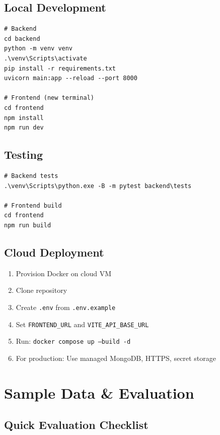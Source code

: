 \documentclass[11pt]{article}
\begin{document}
\subsection{Local Development}

\begin{verbatim}
# Backend
cd backend
python -m venv venv
.\venv\Scripts\activate
pip install -r requirements.txt
uvicorn main:app --reload --port 8000

# Frontend (new terminal)
cd frontend
npm install
npm run dev
\end{verbatim}

\subsection{Testing}

\begin{verbatim}
# Backend tests
.\venv\Scripts\python.exe -B -m pytest backend\tests

# Frontend build
cd frontend
npm run build
\end{verbatim}

\subsection{Cloud Deployment}

\begin{enumerate}
  \item Provision Docker on cloud VM
  \item Clone repository
  \item Create \texttt{.env} from \texttt{.env.example}
  \item Set \texttt{FRONTEND\_URL} and \texttt{VITE\_API\_BASE\_URL}
  \item Run: \texttt{docker compose up --build -d}
  \item For production: Use managed MongoDB, HTTPS, secret storage
\end{enumerate}

\newpage

\section{Sample Data \& Evaluation}

\subsection{Quick Evaluation Checklist}
\end{document}
